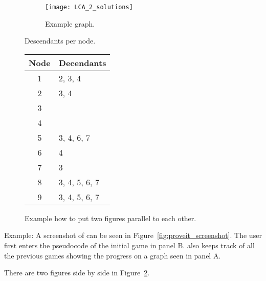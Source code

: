 \begin{figure} [htbp]
  \centering
\begin{subfigure}[c]{0.45\textwidth}
\texttt{[image: LCA\_2\_solutions]}
\caption{Example graph.}
\label{fig:graph}
\end{subfigure}
\hfil
\begin{subtable}[c]{0.3\textwidth}
\centering
\caption{Descendants per node.}
\begin{tabular}{cl}
  \toprule
	Node & Decendants \\
  \midrule
  1 & 2, 3, 4 \\
  2 & 3, 4 \\
  3 & \\
  4 & \\
  5 & 3, 4, 6, 7 \\
  6 & 4 \\
  7 & 3 \\
  8 & 3, 4, 5, 6, 7\\
  9 & 3, 4, 5, 6, 7\\
  \bottomrule
\end{tabular}
\end{subtable}
%
\caption{Example how to put two figures parallel to each other.}
\label{fig:LCA_2_solutions}
\end{figure}


Example: A screenshot of \proveit can be seen in Figure~\ref{fig:proveit_screenshot}. The user first enters the pseudocode of the initial game in panel B. \proveit also keeps track of all the previous games showing the progress on a graph seen in panel A.

There are two figures side by side in Figure~\ref{fig:LCA_2_solutions}.
